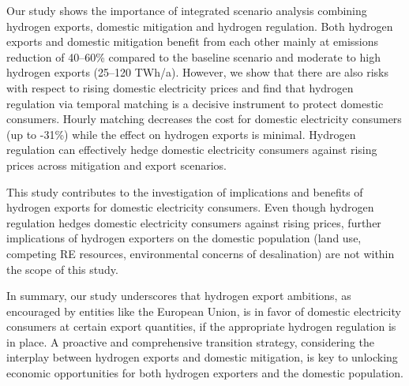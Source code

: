 



Our study shows the importance of integrated scenario analysis combining hydrogen exports, domestic mitigation and hydrogen regulation.
Both hydrogen exports and domestic mitigation benefit from each other mainly at emissions reduction of 40--60\% compared to the baseline scenario and moderate to high hydrogen exports (25--120 TWh/a).
However, we show that there are also risks with respect to rising domestic electricity prices
and find that hydrogen regulation via temporal matching is a decisive instrument
to protect domestic consumers. Hourly matching decreases the cost for domestic electricity consumers (up to -31\%) while the effect on hydrogen exports is minimal. Hydrogen regulation can effectively hedge domestic electricity consumers against rising prices across mitigation and export scenarios. %

This study contributes to the investigation of implications and benefits of hydrogen exports for domestic electricity consumers. Even though hydrogen regulation hedges domestic electricity consumers against rising prices, further implications of hydrogen exporters on the domestic population (land use, competing RE resources, environmental concerns of desalination) are not within the scope of this study.

In summary, our study underscores that hydrogen export ambitions, as encouraged by entities like the European Union, is in favor of domestic electricity consumers at certain export quantities, if the appropriate hydrogen regulation is in place. A proactive and comprehensive transition strategy, considering the interplay between hydrogen exports and domestic mitigation, is key to unlocking economic opportunities for both hydrogen exporters and the domestic population. 


